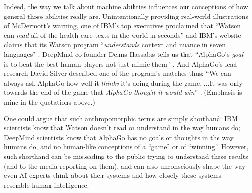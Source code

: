 \documentclass[12pt]{article}
\begin{document}
Indeed, the way we talk about machine abilities influences our conceptions of how general those abilities really are.  Unintentionally providing real-world illustrations of McDermott's warning, one of IBM's top executives proclaimed that ``Watson can \textit{read} all of the health-care texts in the world in seconds'' \cite{Gustin2011} and IBM's website claims that its Watson program ``\textit{understands} context and nuance in seven languages'' \cite{IBMCognitive}. DeepMind co-founder Demis Hassabis tells us that ``AlphaGo's \textit{goal} is to beat the best human players not just mimic them'' \cite{KoreaHerald2016}. And AlphaGo's lead research David Silver described one of the program's matches thus: ``We can always ask AlphaGo how well it \textit{thinks} it's doing during the game. ...It was only towards the end of the game that \textit{AlphaGo thought it would win}''  \cite{Shead2017}. (Emphasis is mine in the quotations above.) 

One could argue that such anthropomorphic terms are simply shorthand: IBM scientists know that Watson doesn't read or understand in the way humans do; DeepMind scientists know that AlphaGo has no goals or thoughts in the way humans do, and no human-like conceptions of a ``game'' or of ``winning.'' However, such shorthand can be misleading to the public trying to understand these results (and to the media reporting on them), and can also unconsciously shape the way even AI experts think about their systems and how closely these systems resemble human intelligence.
\end{document}
